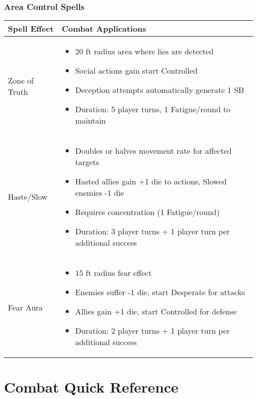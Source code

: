 \subsubsection{Area Control Spells}
\begin{longtable}{|>{\raggedright\arraybackslash}p{4cm}|>{\raggedright\arraybackslash}p{8cm}|}
\hline
\textbf{Spell Effect} & \textbf{Combat Applications} \\
\hline
Zone of Truth & 
\begin{itemize}
    \item 20 ft radius area where lies are detected
    \item Social actions gain start Controlled
    \item Deception attempts automatically generate 1 SB
    \item Duration: 5 player turns, 1 Fatigue/round to maintain
\end{itemize} \\
\hline
Haste/Slow & 
\begin{itemize}
    \item Doubles or halves movement rate for affected targets
    \item Hasted allies gain +1 die to actions, Slowed enemies -1 die
    \item Requires concentration (1 Fatigue/round)
    \item Duration: 3 player turns + 1 player turn per additional success
\end{itemize} \\
\hline
Fear Aura & 
\begin{itemize}
    \item 15 ft radius fear effect
    \item Enemies suffer -1 die, start Desperate for attacks
    \item Allies gain +1 die, start Controlled for defense
    \item Duration: 2 player turns + 1 player turn per additional success
\end{itemize} \\
\hline
\end{longtable}

\newpage

\section{Combat Quick Reference}


